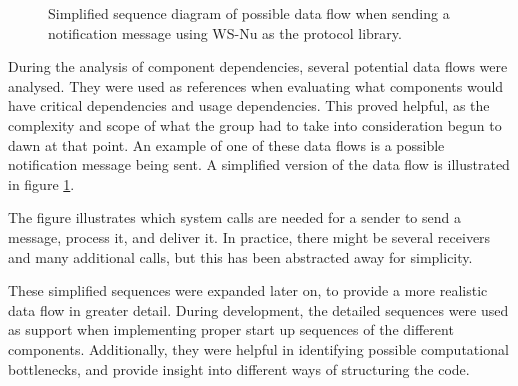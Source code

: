 \begin{center}
  \begin{figure}[ht!]
    \caption{Simplified sequence diagram of possible data flow when sending a notification message using WS-Nu as the protocol library.}
    \label{fig:architecture_data_flow_simple}
  \end{figure}
\end{center}

During the analysis of component dependencies, several potential data flows were analysed. They were used as references when evaluating what components would have critical dependencies and usage dependencies. This proved helpful, as the complexity and scope of what the group had to take into consideration begun to dawn at that point. An example of one of these data flows is a possible notification message being sent. A simplified version of the data flow is illustrated in figure \ref{fig:architecture_data_flow_simple}.

The figure illustrates which system calls are needed for a sender to send a message, process it, and deliver it. In practice, there might be several receivers and many additional calls, but this has been abstracted away for simplicity.

These simplified sequences were expanded later on, to provide a more realistic data flow in greater detail. During development, the detailed sequences were used as support when implementing proper start up sequences of the different components. Additionally, they were helpful in identifying possible computational bottlenecks, and provide insight into different ways of structuring the code.

\clearpage

